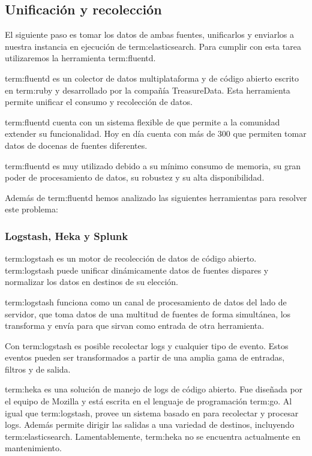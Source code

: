 \subsection{Unificación y recolección}
\label{unificacion_y_recoleccion}

El siguiente paso es tomar los datos de ambas fuentes, unificarlos y enviarlos
a nuestra instancia en ejecución de \gls{term:elasticsearch}. Para cumplir con
esta tarea utilizaremos la herramienta \gls{term:fluentd}.

\gls{term:fluentd} es un colector de datos multiplataforma y de código abierto
escrito en \gls{term:ruby} y desarrollado por la compañía TreasureData. Esta
herramienta permite unificar el consumo y recolección de datos.

\gls{term:fluentd} cuenta con un sistema flexible de  que permite
a la comunidad extender su funcionalidad. Hoy en día cuenta con más de 300
 que permiten tomar datos de docenas de fuentes diferentes.

\gls{term:fluentd} es muy utilizado debido a su mínimo consumo de memoria, su
gran poder de procesamiento de datos, su robustez y su alta disponibilidad.

Además de \gls{term:fluentd} hemos analizado las siguientes herramientas para
resolver este problema:

\subsubsection{Logstash, Heka y Splunk}

\gls{term:logstash} es un motor de recolección de datos de código abierto.
\gls{term:logstash} puede unificar dinámicamente datos de fuentes dispares y
normalizar los datos en destinos de su elección. 

\gls{term:logstash} funciona como un canal de procesamiento de datos del lado
de servidor, que toma datos de una multitud de fuentes de forma simultánea, los
transforma y envía para que sirvan como entrada de otra herramienta.

Con \gls{term:logstash} es posible recolectar logs y cualquier tipo de evento.
Estos eventos pueden ser transformados a partir de una amplia gama de entradas,
filtros y  de salida.

\gls{term:heka} es una solución de manejo de logs de código abierto. Fue
diseñada por el equipo de Mozilla y está escrita en el lenguaje de programación
\gls{term:go}. Al igual que \gls{term:logstash}, provee un sistema basado en
 para recolectar y procesar logs. Además permite dirigir las
salidas a una variedad de destinos, incluyendo \gls{term:elasticsearch}.
Lamentablemente, \gls{term:heka} no se encuentra actualmente en mantenimiento.


